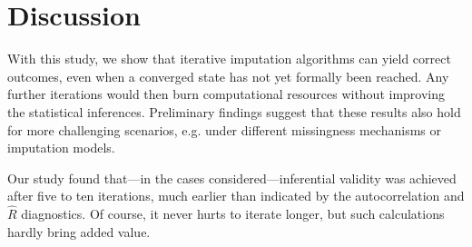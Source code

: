 \documentclass{article}
\begin{document}
% 
% 




\section{Discussion}
\label{discussion}

With this study, we show that iterative imputation algorithms can yield correct outcomes, even when a converged state has not yet formally been reached. Any further iterations would then burn computational resources without improving the statistical inferences. Preliminary findings suggest that these results also hold for more challenging scenarios, e.g. under different missingness mechanisms or imputation models. 

Our study found that---in the cases considered---inferential validity was achieved after five to ten iterations, much earlier than indicated by the autocorrelation and \(\widehat{R}\) diagnostics. Of course, it never hurts to iterate longer, but such calculations hardly bring added value.





\end{document}
